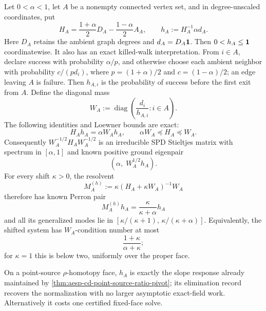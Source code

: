 \begin{lemma}
\label{lem:aesp-cd-point-source-ground-state-normalization}
Let \(0<\alpha<1\), let \(A\) be a nonempty connected vertex set, and in degree-unscaled
coordinates, put
\begin{equation*}
 H_A=\frac{1+\alpha}{2}D_A-\frac{1-\alpha}{2}A_A,
 \qquad
 h_A:=H_A^{-1}\alpha d_A.
\end{equation*}
Here \(D_A\) retains the ambient graph degrees and \(d_A=D_A\mathbf{1}\).
Then \(0<h_A\leq\mathbf{1}\) coordinatewise.  It also has an exact killed-walk
interpretation.  From \(i\in A\), declare success with probability
\(\alpha/p\), and otherwise choose each ambient neighbor with probability
\(c/(pd_i)\), where
\(p=(1+\alpha)/2\) and \(c=(1-\alpha)/2\); an edge leaving \(A\) is failure.
Then \(h_{A,i}\) is the probability of success before the first exit from
\(A\).  Define the diagonal mass
\begin{equation}
 W_A:=\operatorname{diag}\!\left(\frac{d_i}{h_{A,i}}:i\in A\right).
 \label{eq:aesp-cd-point-source-ground-mass}
\end{equation}
The following identities and Loewner bounds are exact:
\begin{equation}
 H_Ah_A=\alpha W_Ah_A,\qquad
 \alpha W_A\preceq H_A\preceq W_A.
 \label{eq:aesp-cd-point-source-ground-sandwich}
\end{equation}
Consequently
\(W_A^{-1/2}H_AW_A^{-1/2}\) is an irreducible SPD Stieltjes
matrix with spectrum in \([\alpha,1]\) and known positive ground eigenpair
\begin{equation*}
 \left(\alpha,\;W_A^{1/2}h_A\right).
\end{equation*}
For every shift \(\kappa>0\), the resolvent
\begin{equation*}
 M_A^{(h)}:=\kappa(H_A+\kappa W_A)^{-1}W_A
\end{equation*}
therefore has known Perron pair
\begin{equation*}
 M_A^{(h)}h_A=\frac{\kappa}{\kappa+\alpha}h_A
\end{equation*}
and all its generalized modes lie in
\([\kappa/(\kappa+1),\,\kappa/(\kappa+\alpha)]\).
Equivalently, the shifted system has \(W_A\)-condition number at most
\begin{equation*}
 \frac{1+\kappa}{\alpha+\kappa};
\end{equation*}
for \(\kappa=1\) this is below two, uniformly over the proper face.

On a point-source \(\rho\)-homotopy face, \(h_A\) is exactly the slope
response already maintained by
\cref{thm:aesp-cd-point-source-ratio-pivot}; its elimination record recovers
the normalization with no larger asymptotic exact-field work.  Alternatively
it costs one certified fixed-face solve.


\end{lemma}
